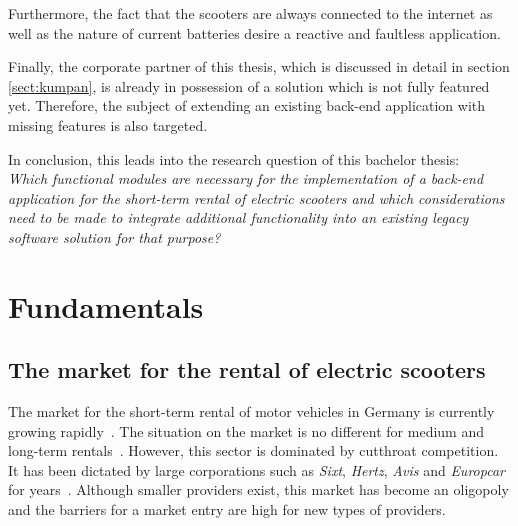 \documentclass[12pt,a4paper]{report}
\begin{document}
Furthermore, the fact that the scooters are always connected to the internet
as well as the nature of current batteries desire a reactive and faultless application.

Finally, the corporate partner of this thesis, which is discussed in detail
in section \ref{sect:kumpan}, is already in possession of a solution which is not fully featured yet.
Therefore, the subject of extending an existing back-end application with missing features is also targeted.

In conclusion, this leads into the research question of this bachelor thesis:\\
\emph{Which functional modules are necessary for the implementation of a back-end application
for the short-term rental of electric scooters and which considerations need to be made
to integrate additional functionality into an existing legacy software solution for that purpose?}



\chapter{Fundamentals} \label{chap:fundamentals}



\section{The market for the rental of electric scooters} \label{sect:electric-scooter-market}

The market for the short-term rental of motor vehicles in Germany
is currently growing rapidly~\cite{bundesverband-carsharing-statistics}.
The situation on the market is no different for medium and long-term rentals~\cite{sparkasse-kfz-vermietung}.
However, this sector is dominated by cutthroat competition.
It has been dictated by large corporations such as \textit{Sixt}, \textit{Hertz},
\textit{Avis} and \textit{Europcar} for years~\cite{sparkasse-kfz-vermietung}.
Although smaller providers exist, this market has become an oligopoly and
the barriers for a market entry are high for new types of providers.
\end{document}
